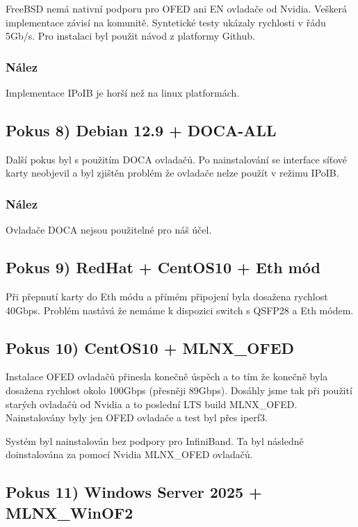 FreeBSD nemá nativní podporu pro OFED ani EN ovladače od Nvidia. Veškerá implementace závisí na komunitě. Syntetické testy ukázaly rychlosti v řádu 5Gb/s. Pro instalaci byl použit návod\cite{OFEDBSD} z platformy Github.

\subsubsection{Nález}
Implementace IPoIB je horší než na linux platformách.


\subsection{Pokus 8) Debian 12.9 + DOCA-ALL}
\label{pokus8}
\nepovedeno

Další pokus byl s použitím DOCA\cite{DOCA} ovladačů. Po nainstalování se interface síťové karty neobjevil a byl zjištěn problém že ovladače nelze použít v režimu IPoIB.

\subsubsection{Nález}
Ovladače DOCA\cite{DOCA} nejsou použitelné pro náš účel.

\subsection{Pokus 9) RedHat + CentOS10 + Eth mód}
\label{pokus9}
\nepovedeno

Při přepnutí karty do Eth módu a přímém připojení byla dosažena rychlost 40Gbps. Problém nastává že nemáme k dispozici switch s QSFP28 a Eth módem.

\subsection{Pokus 10) CentOS10 + MLNX\_OFED}
\label{pokus10}
\povedeno

Instalace OFED ovladačů přinesla konečně úspěch a to tím že konečně byla dosažena rychlost okolo 100Gbps (přesněji 89Gbps). Dosáhly jsme tak při použití starých ovladačů od Nvidia a to poslední LTS build MLNX\_OFED. Nainstalovány byly jen OFED ovladače a test byl přes iperf3.

Systém byl nainstalován bez podpory pro InfiniBand. Ta byl následně doinstalována za pomocí Nvidia MLNX\_OFED ovladačů.

\newpage
\subsection{Pokus 11) Windows Server 2025 + MLNX\_WinOF2}
\label{pokus11} 
\nepovedeno

